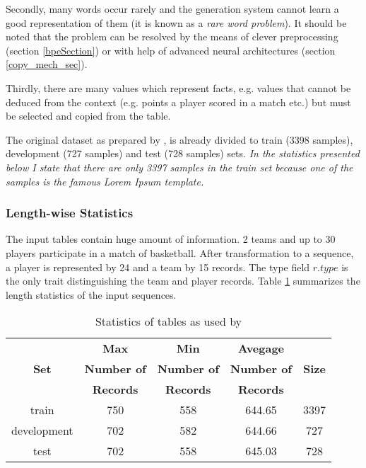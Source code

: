 Secondly, many words occur rarely and the generation system cannot learn a good representation of them (it is known as a \emph{rare word problem}). It should be noted that the problem can be resolved by the means of clever preprocessing (section \ref{bpeSection}) or with help of advanced neural architectures (section \ref{copy_mech_sec}).

Thirdly, there are many values which represent facts, e.g. values that cannot be deduced from the context (e.g. points a player scored in a match etc.) but must be selected and copied from the table.

The original dataset as prepared by \citep{wiseman2017}, is already divided to train (3398 samples), development (727 samples) and test (728 samples) sets. \emph{In the statistics presented below I state that there are only 3397 samples in the train set because one of the samples is the famous Lorem Ipsum template.}

\subsubsection{Length-wise Statistics}

The input tables contain huge amount of information. 2 teams and up to 30 players participate in a match of basketball. After transformation to a sequence, a player is represented by 24 and a team by 15 records. The type field $r.type$ is the only trait distinguishing the team and player records. Table \ref{stats_tables_orig_rw} summarizes the length statistics of the input sequences. 

\begin{table}[h!]
    \centering
    \begin{tabular}{ccccc}
        \toprule
        {}    & \textbf{Max} & \textbf{Min} & \textbf{Avegage}& {} \\
        \textbf{Set} & \textbf{Number of} & \textbf{Number of} & \textbf{Number of} & \textbf{Size} \\
        {} & \textbf{Records} & \textbf{Records} & \textbf{Records} & {} \\
        \midrule
        train       & 750 & 558 & 644.65 & 3397  \\
        development & 702 & 582 & 644.66 & 727 \\
        test        & 702 & 558 & 645.03 & 728
    \end{tabular}
    \caption{Statistics of tables as used by \citep{wiseman2017}} \label{stats_tables_orig_rw}
\end{table}

